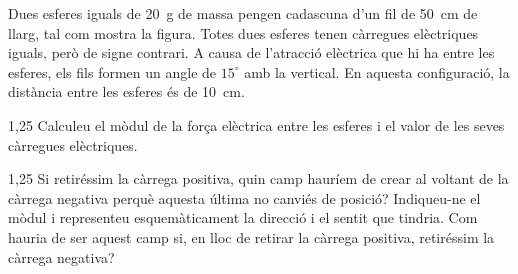 Dues esferes iguals de 20~g de massa pengen cadascuna d'un fil de 50~cm de llarg, tal com mostra la figura. Totes dues esferes tenen càrregues elèctriques iguals, però de signe contrari. A causa de l'atracció elèctrica que hi ha entre les esferes, els fils formen un angle de $15^\circ$ amb la vertical. En aquesta configuració, la distància entre les esferes és de 10~cm.


\begin{apartat}{1,25}
Calculeu el mòdul de la força elèctrica entre les esferes i el valor de les seves càrregues elèctriques.
\end{apartat}

\begin{apartat}{1,25}
Si retiréssim la càrrega positiva, quin camp hauríem de crear al voltant de la càrrega negativa perquè aquesta última no canviés de posició? Indiqueu-ne el mòdul i representeu esquemàticament la direcció i el sentit que tindria. Com hauria de ser aquest camp si, en lloc de retirar la càrrega positiva, retiréssim la càrrega negativa?
\end{apartat}

